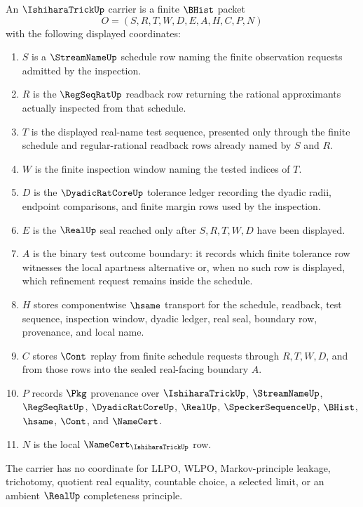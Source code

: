 \begin{definition}
\label{def:ishihara-trick-carrier}
An $\IshiharaTrickUp$ carrier is a finite $\BHist$ packet
$$
O=(S,R,T,W,D,E,A,H,C,P,N)
$$
with the following displayed coordinates:
\begin{enumerate}
\item $S$ is a $\StreamNameUp$ schedule row naming the finite observation requests admitted by the inspection.
\item $R$ is the $\RegSeqRatUp$ readback row returning the rational approximants actually inspected from that schedule.
\item $T$ is the displayed real-name test sequence, presented only through the finite schedule and regular-rational readback rows already named by $S$ and $R$.
\item $W$ is the finite inspection window naming the tested indices of $T$.
\item $D$ is the $\DyadicRatCoreUp$ tolerance ledger recording the dyadic radii, endpoint comparisons, and finite margin rows used by the inspection.
\item $E$ is the $\RealUp$ seal reached only after $S,R,T,W,D$ have been displayed.
\item $A$ is the binary test outcome boundary: it records which finite tolerance row witnesses the local apartness alternative or, when no such row is displayed, which refinement request remains inside the schedule.
\item $H$ stores componentwise $\hsame$ transport for the schedule, readback, test sequence, inspection window, dyadic ledger, real seal, boundary row, provenance, and local name.
\item $C$ stores $\Cont$ replay from finite schedule requests through $R,T,W,D$, and from those rows into the sealed real-facing boundary $A$.
\item $P$ records $\Pkg$ provenance over $\IshiharaTrickUp$, $\StreamNameUp$, $\RegSeqRatUp$, $\DyadicRatCoreUp$, $\RealUp$, $\SpeckerSequenceUp$, $\BHist$, $\hsame$, $\Cont$, and $\NameCert$.
\item $N$ is the local $\NameCert_{\IshiharaTrickUp}$ row.
\end{enumerate}
The carrier has no coordinate for LLPO, WLPO, Markov-principle leakage, trichotomy, quotient real equality, countable choice, a selected limit, or an ambient $\RealUp$ completeness principle.
\end{definition}

